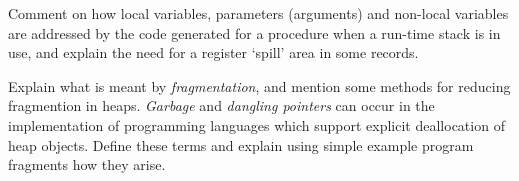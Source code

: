 \begin{questions}
\begin{subquestions}
\subquestion

Comment on how local variables,
parameters (arguments) and non-local variables
are addressed by the code generated for a
procedure when a run-time stack is in use,
and explain the need for a register `spill' area
in some records.

\subquestion
Explain what is 
meant by {\em fragmentation}, and mention some methods
for reducing fragmention in heaps.  
{\em Garbage\/} and {\em dangling pointers}
can occur in the implementation of programming languages which
support explicit deallocation of heap objects. Define
these terms and explain using simple example program
fragments how they arise.

\end{subquestions}

\end{questions} 




